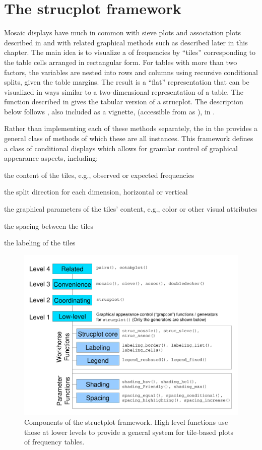 \documentclass[11pt]{book}\usepackage[]{graphicx}\usepackage[]{color}
\begin{document}
\section{The strucplot framework}\label{sec:mosaic-strucplot}
Mosaic displays have much in common with sieve plots and association plots
described in  and with related graphical methods
such as  described later in this chapter.
The main idea is to visualize a \ctab of frequencies by ``tiles'' corresponding
to the table cells arranged in rectangular form. 
For \mway tables with more than two factors,
the variables are nested into rows and columns using recursive
conditional splits, given the table margins. The result is a
``flat'' representation that can be visualized in
ways similar to a two-dimensional representation of a table. 
The  function described in  gives the tabular
version of a strucplot.  The description below follows \citet{MeyerZeileisHornik:2006}, also
included as a vignette, 
(accessible from \R as ), in .

Rather than implementing each of these methods separately, the
 in the  provides a 
general class of methods of which these are all instances.
This framework defines a class of conditional displays which allows
for granular control of graphical appearance aspects, including:

\begin{itemize*}
\item the content of the tiles, e.g., observed or expected frequencies
\item the split direction for each dimension, horizontal or vertical
\item the graphical parameters of the tiles' content, e.g., color or other visual attributes
\item the spacing between the tiles
\item the labeling of the tiles
\end{itemize*}

\begin{figure}
\includegraphics[width=.8\textwidth]{ch05/fig/struc}
\caption{Components of the structplot framework. High level functions use those at lower levels to provide a general system for tile-based plots of frequency tables.}
\label{fig:struc}
\end{figure}
\end{document}
